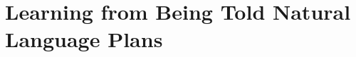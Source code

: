 \chapter{Learning from Being Told Natural Language Plans}
\label{chapter:learning_from_being_told_natural_language_plans}

